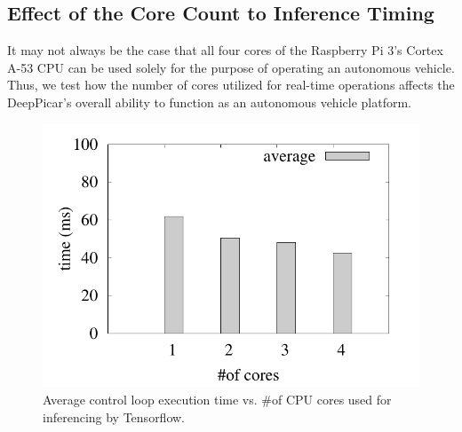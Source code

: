 

\subsection{Effect of the Core Count to Inference Timing}
It may not always be the case that all four cores of the Raspberry Pi 3's Cortex A-53 CPU can be used 
solely for the purpose of operating an autonomous vehicle. Thus, we test how the number of cores 
utilized for real-time operations affects the DeepPicar's overall ability to function as an autonomous 
vehicle platform.

\begin{figure}[h]
  \centering
  \includegraphics[width=.5\textwidth]{figs/perf_vs_corecnt}
  \caption{Average control loop execution time vs. \#of CPU cores used
    for inferencing by Tensorflow.}
  \label{fig:perf-vs-corecnt}
\end{figure}

